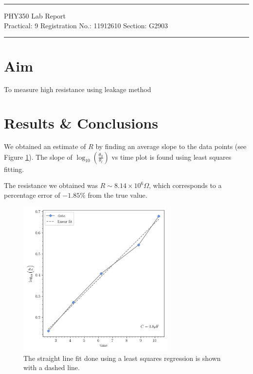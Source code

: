\documentclass{article}
\begin{document}
	
	\author{Aayush Arya}
	\date{(Submitted: \today)}
	\title{}
	
	\maketitle
	
	\hrule
	\begin{center}
		PHY350 Lab Report\\
		Practical: 9 \quad Registration No.: 11912610 \quad Section: G2903
	\end{center}
	\hrule
	
	\section*{Aim}
	To measure high resistance using leakage method
	
	\section*{Results \& Conclusions}
	
	We obtained an estimate of $R$ by finding an average slope to the data points (see Figure \ref{fig:out}). The slope of $\log_{10}\left(\frac{\theta_0}{\theta_t}\right)$ vs time plot is found using least squares fitting.
	
	The resistance we obtained was $R \sim 8.14 \times 10^6 \Omega$, which corresponds to a percentage error of $-1.85\%$ from the true value. 
	
	\begin{figure}[h!]
		\centering
		\includegraphics[width=0.7\textwidth]{prac9_plot}
		\caption{The straight line fit done using a least squares regression is shown with a dashed line.}
		\label{fig:out}
	\end{figure}
	
\end{document}
